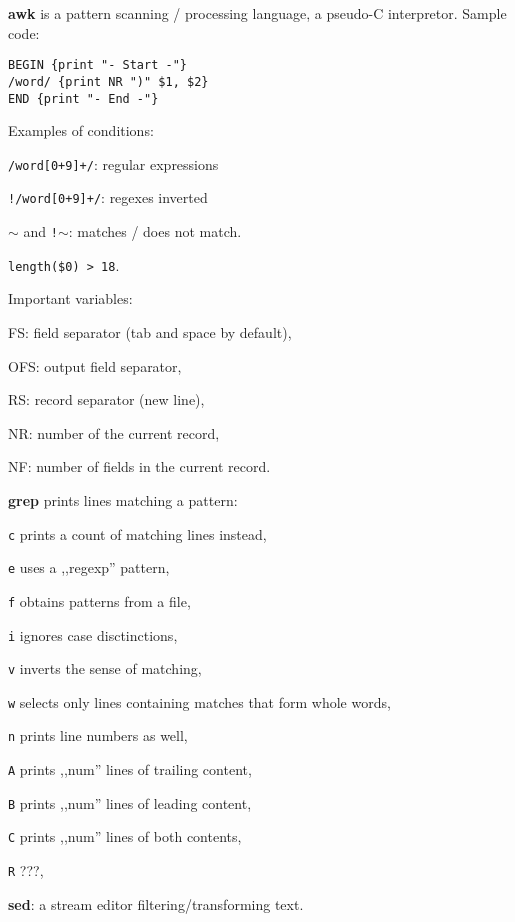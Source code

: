 \renewcommand\theFancyVerbLine{\normalsize\arabic{FancyVerbLine}}

\begin{enumx}
    \item [\cmd] \textbf{awk} is a pattern scanning / processing language,
    a pseudo-C interpretor.
    Sample code:
\begin{verbatim}
BEGIN {print "- Start -"}
/word/ {print NR ")" $1, $2}
END {print "- End -"}
\end{verbatim}

\item [] Examples of conditions:
\begin{enumx}
    \item \texttt{/word[0+9]+/}: regular expressions
    \item \texttt{!/word[0+9]+/}: regexes inverted
    \item \texttt{$\sim$} and \texttt{!$\sim$}: matches / does not match.
    \item \texttt{length(\$0) > 18}.
\end{enumx} 

\item [] Important variables:
\begin{enumx}
    \item FS: field separator (tab and space by default),
    \item OFS: output field separator,
    \item RS: record separator (new line),
    \item NR: number of the current record,
    \item NF: number of fields in the current record.
\end{enumx} 

\item [\cmd] \textbf{grep} prints lines matching a pattern:
\item [\texttt{c}] prints a count of matching lines instead,
\item [\texttt{e}] uses a ,,regexp'' pattern,
\item [\texttt{f}] obtains patterns from a file,
\item [\texttt{i}] ignores case disctinctions,
\item [\texttt{v}] inverts the sense of matching,
\item [\texttt{w}] selects only lines containing matches that form whole words,
\item [\texttt{n}] prints line numbers as well,
\item [\texttt{A}] prints ,,num'' lines of trailing content,
\item [\texttt{B}] prints ,,num'' lines of leading content,
\item [\texttt{C}] prints ,,num'' lines of both contents,
\item [\texttt{R}] ???,
\item [\cmd] \textbf{sed}: a stream editor filtering/transforming text.
\end{enumx}

